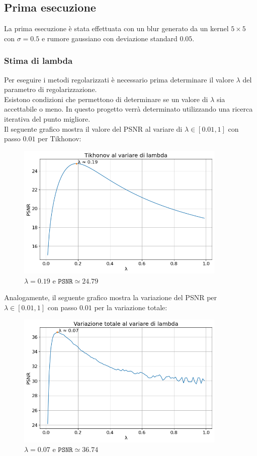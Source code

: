 \documentclass[11pt]{article}
\begin{document}
\subsection{Prima esecuzione}
La prima esecuzione è stata effettuata con un blur generato da un kernel $5 \times 5$ con $\sigma=0.5$ e rumore gaussiano con deviazione standard $0.05$.

\subsubsection{Stima di lambda}
Per eseguire i metodi regolarizzati è necessario prima determinare il valore $\lambda$ del parametro di regolarizzazione.\\
Esistono condizioni che permettono di determinare se un valore di $\lambda$ sia accettabile o meno. In questo progetto verrà determinato utilizzando una ricerca iterativa del punto migliore.\\
Il seguente grafico mostra il valore del PSNR al variare di $\lambda \in [0.01, 1]$ con passo $0.01$ per Tikhonov:
\begin{figure}[H]
    \centering
    \includegraphics[width=10cm]{esecuzione/1/tikhonov_lambda.png}
    \caption{$\lambda=0.19$ e $\texttt{PSNR} \simeq 24.79$}
    \label{fig:tikhonov_lambda1}
\end{figure}
Analogamente, il seguente grafico mostra la variazione del PSNR per $\lambda \in [0.01, 1]$ con passo $0.01$ per la variazione totale:
\begin{figure}[H]
    \centering
    \includegraphics[width=10cm]{esecuzione/1/tv_lambda.png}
    \caption{$\lambda=0.07$ e $\texttt{PSNR} \simeq 36.74$}
    \label{fig:tv_lambda1}
\end{figure}
\end{document}
